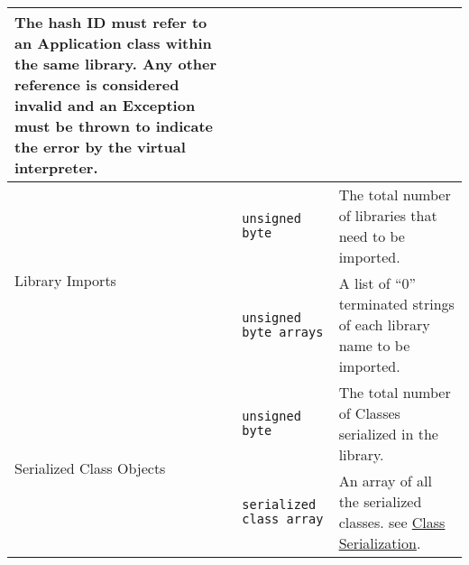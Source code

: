 \begin{center}
\begin{tabular}{ |l|p{4.5cm}|p{7.5cm}| }
    The hash ID must refer to an Application class within the same library.
    Any other reference is considered invalid and an Exception must be
    thrown to indicate the error by the virtual interpreter. \\ \hline
  	\multirow{2}{*}{Library Imports}          & \texttt{unsigned byte}                                                & The total number of libraries that need to be imported.                                                                                                                                                                                                                                                                                                                                                                                                                    \\ \cline{2-3}
  	                                          & \texttt{unsigned byte arrays}                                         & A list of ``0'' terminated strings of each library name to be imported.                                                                                                                                                                                                                                                                                                                                                                                                    \\ \hline
  	\multirow{2}{*}{Serialized Class Objects} & \texttt{unsigned byte}                                                & The total number of Classes serialized in the library.                                                                                                                                                                                                                                                                                                                                                                                                                     \\ \cline{2-3}
  	                                          & \texttt{serialized class array}                                       & An array of all the serialized classes. see \hyperref[sec:class_serial]{Class Serialization}.                                                                                                                                                                                                                                                                                                                                                                              \\ \hline
  \end{tabular}
\end{center}

